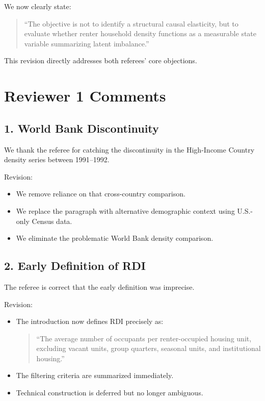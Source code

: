\documentclass[12pt]{article}
\begin{document}
We now clearly state:

\begin{quote}
“The objective is not to identify a structural causal elasticity, but to evaluate whether renter household density functions as a measurable state variable summarizing latent imbalance.”
\end{quote}

This revision directly addresses both referees’ core objections.

\section*{Reviewer 1 Comments}

\subsection*{1. World Bank Discontinuity}

We thank the referee for catching the discontinuity in the High-Income Country density series between 1991–1992.

Revision:

\begin{itemize}
\item We remove reliance on that cross-country comparison.
\item We replace the paragraph with alternative demographic context using U.S.-only Census data.
\item We eliminate the problematic World Bank density comparison.
\end{itemize}

\subsection*{2. Early Definition of RDI}

The referee is correct that the early definition was imprecise.

Revision:

\begin{itemize}
\item The introduction now defines RDI precisely as:
  \begin{quote}
  “The average number of occupants per renter-occupied housing unit, excluding vacant units, group quarters, seasonal units, and institutional housing.”
  \end{quote}
\item The filtering criteria are summarized immediately.
\item Technical construction is deferred but no longer ambiguous.
\end{itemize}
\end{document}
